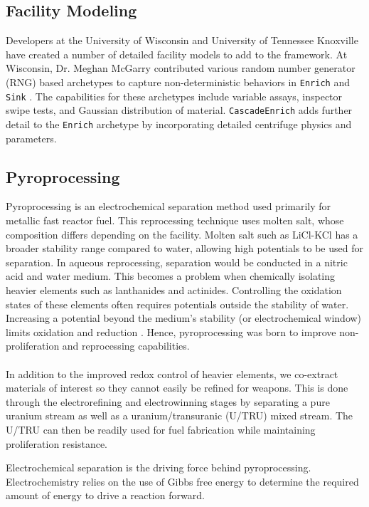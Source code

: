 \subsection{Facility Modeling}
Developers at the University of Wisconsin and University of Tennessee Knoxville have created a number of detailed facility models to add to the \Cyclus framework. At Wisconsin, Dr. Meghan McGarry contributed various random number generator (RNG) based archetypes to capture non-deterministic behaviors in \texttt{Enrich} and \texttt{Sink} \cite{mcgarry_mbmore_2017}. The capabilities for these archetypes include variable assays, inspector swipe tests, and Gaussian distribution of material. \texttt{CascadeEnrich} adds further detail to the \texttt{Enrich} archetype by incorporating detailed centrifuge physics and parameters. 

\subsection{Pyroprocessing}
Pyroprocessing is an electrochemical separation method used primarily for metallic fast reactor fuel.
This reprocessing technique uses molten salt, whose composition differs depending on the facility.
Molten salt such as LiCl-KCl has a broader stability range compared to water, allowing high potentials to be used for separation.
In aqueous reprocessing, separation would be conducted in a nitric acid and water medium.
This becomes a problem when chemically isolating heavier elements such as lanthanides and actinides.
Controlling the oxidation states of these elements often requires potentials outside the stability of water. 
Increasing a potential beyond the medium's stability (or electrochemical window) limits oxidation and reduction \cite{hayyan_investigating_2013}.
Hence, pyroprocessing was born to improve non-proliferation and reprocessing capabilities.
\\ \\
In addition to the improved redox control of heavier elements, we co-extract materials of interest so they cannot easily be refined for weapons.
This is done through the electrorefining and electrowinning stages by separating a pure uranium stream as well as a uranium/transuranic (U/TRU) mixed stream. 
The U/TRU can then be readily used for fuel fabrication while maintaining proliferation resistance.

Electrochemical separation is the driving force behind pyroprocessing. Electrochemistry relies on the use of Gibbs free energy to determine the required amount of energy to drive a reaction forward.

